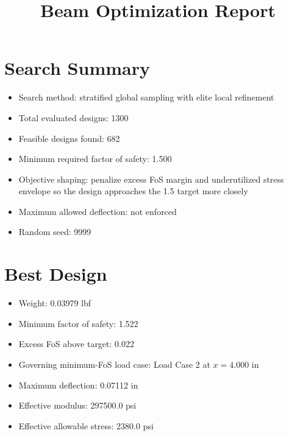 \documentclass[11pt]{article}
\title{Beam Optimization Report}
\date{}
\begin{document}
\maketitle

\section*{Search Summary}
\begin{itemize}
\item Search method: stratified global sampling with elite local refinement
\item Total evaluated designs: 1300
\item Feasible designs found: 682
\item Minimum required factor of safety: 1.500
\item Objective shaping: penalize excess FoS margin and underutilized stress envelope so the design approaches the 1.5 target more closely
\item Maximum allowed deflection: not enforced
\item Random seed: 9999
\end{itemize}

\section*{Best Design}
\begin{itemize}
\item Weight: 0.03979 lbf
\item Minimum factor of safety: 1.522
\item Excess FoS above target: 0.022
\item Governing minimum-FoS load case: Load Case 2 at $x=4.000$ in
\item Maximum deflection: 0.07112 in
\item Effective modulus: 297500.0 psi
\item Effective allowable stress: 2380.0 psi
\end{itemize}
\end{document}
